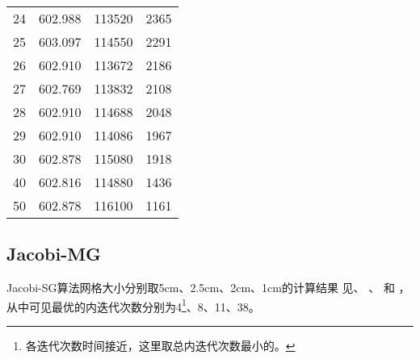 \begin{datasheet}
\begin{table}
\begin{tabular}{cccc}
24 & 602.988 & 113520 & 2365 \\ %
25 & 603.097 & 114550 & 2291 \\ %
26 & 602.910 & 113672 & 2186 \\ %
27 & 602.769 & 113832 & 2108 \\ %
28 & 602.910 & 114688 & 2048 \\ %
29 & 602.910 & 114086 & 1967 \\ %
30 & 602.878 & 115080 & 1918 \\ %
40 & 602.816 & 114880 & 1436 \\ %
50 & 602.878 & 116100 & 1161 \\ %
\bottomrule
\end{tabular}
\end{table}

\end{datasheet}


\subsection{Jacobi-MG}
\label{sec:equsolve.iter.jacobi-mg}

Jacobi-SG算法网格大小分别取5cm、2.5cm、2cm、1cm的计算结果
见、%
、%
和%
，
从中可见最优的内迭代次数分别为4\footnote{各迭代次数时间接近，这里取总内迭代次数最小的。}、8、11、38。

